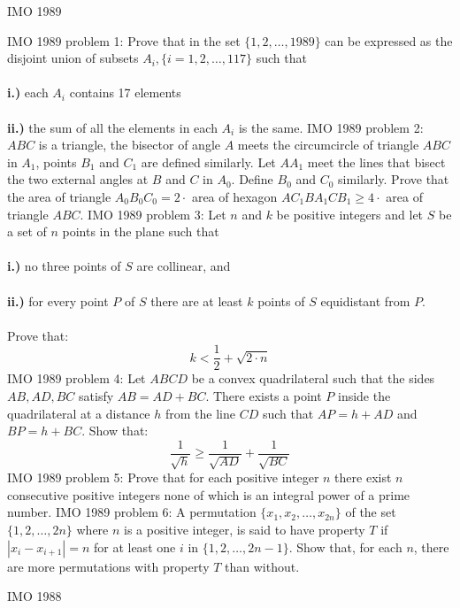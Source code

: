 IMO 1989 

IMO 1989 problem 1:  Prove that in the set $ \{1,2, \ldots, 1989\}$ can be expressed as the disjoint union of subsets $ A_i, \{i = 1,2, \ldots, 117\}$ such that \\\\
\textbf{i.)} each $ A_i$ contains 17 elements \\\\
\textbf{ii.)} the sum of all the elements in each $ A_i$ is the same. 
IMO 1989 problem 2:  $ ABC$ is a triangle, the bisector of angle $ A$ meets the circumcircle of triangle $ ABC$ in $ A_1$, points $ B_1$ and $ C_1$ are defined similarly. Let $ AA_1$ meet the lines that bisect the two external angles at $ B$ and $ C$ in $ A_0$. Define $ B_0$ and $ C_0$ similarly. Prove that the area of triangle $ A_0B_0C_0 = 2 \cdot$ area of hexagon $ AC_1BA_1CB_1 \geq 4 \cdot$ area of triangle $ ABC$. 
IMO 1989 problem 3:  Let $ n$ and $ k$ be positive integers and let $ S$ be a set of $ n$ points in the plane such that \\\\
\textbf{i.)} no three points of $ S$ are collinear, and \\\\
\textbf{ii.)} for every point $ P$ of $ S$ there are at least $ k$ points of $ S$ equidistant from $ P.$ \\\\
Prove that:
\[ k < \frac {1}{2} + \sqrt {2 \cdot n} \] 
IMO 1989 problem 4:  Let $ ABCD$ be a convex quadrilateral such that the sides $ AB, AD, BC$ satisfy $ AB = AD + BC.$ There exists a point $ P$ inside the quadrilateral at a distance $ h$ from the line $ CD$ such that $ AP = h + AD$  and $ BP = h + BC.$ Show that:
\[ \frac {1}{\sqrt {h}} \geq \frac {1}{\sqrt {AD}} + \frac {1}{\sqrt {BC}} \] 
IMO 1989 problem 5:  Prove that for each positive integer $ n$ there exist $ n$ consecutive positive integers none of which is an integral power of a prime number. 
IMO 1989 problem 6:  A permutation $ \{x_1, x_2, \ldots, x_{2n}\}$ of the set $ \{1,2, \ldots, 2n\}$ where $ n$ is a positive integer, is said to have property $ T$ if $ |x_i - x_{i + 1}| = n$ for at least one $ i$ in $ \{1,2, \ldots, 2n - 1\}.$ Show that, for each $ n$, there are more permutations with property $ T$ than without. 

IMO 1988 

